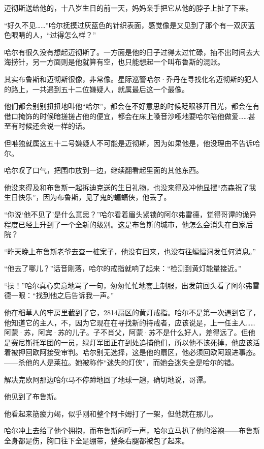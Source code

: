 \documentclass[../main]{subfiles}
\begin{document}
迈彻斯送给他的，十八岁生日的前一天，妈妈亲手把它从他的脖子上扯了下来。

“好久不见\ldots\ldots”哈尔抚摸过灰蓝色的针织表面，感觉像是又见到了那个有一双灰蓝色眼睛的人，“过得怎么样？”

哈尔有很久没有想起迈彻斯了。一方面是他的日子过得太过忙碌，抽不出时间去大海捞针，另一方面则是他就算有空，也只能想起一个叫布鲁斯的混账。

其实布鲁斯和迈彻斯很像，非常像。星际巡警哈尔·乔丹在寻找化名迈彻斯的犯人的路上，一共遇到五十二位嫌疑人，就属最后这一个最像。

他们都会别别扭扭地叫他“哈尔”，都会在不好意思的时候眨眼移开目光，都会在有借口掩饰的时候暗搓搓占他的便宜，都会在床上嗓音沙哑地要哈尔陪他做爱……甚至有时候还会说一样的话。

但唯独就属这五十二号嫌疑人不可能是迈彻斯，因为如果他是，他没理由不告诉哈尔。

哈尔叹了口气，把围巾放到一边，继续翻看起里面的其他东西。

他没来得及和布鲁斯一起拆迪克送的生日礼物，也没来得及冲他显摆“杰森祝了我生日快乐”，因为布鲁斯，见了鬼的蝙蝠侠，他丢了。

“你说`他不见了'是什么意思？”哈尔看着眉头紧锁的阿尔弗雷德，觉得哥谭的诡异程度已经上升到了一个全新的级别。这是布鲁斯的城市，他怎么会消失在自家后院？

“昨天晚上布鲁斯老爷去查一桩案子，他没有回来，也没有往蝙蝠洞发任何消息。”

“他去了哪儿？”话音刚落，哈尔的戒指就响了起来：“检测到黄灯能量接近。”

“操！”哈尔真心实意地骂了一句，匆匆忙忙地套上制服，出发前回头看了阿尔弗雷德一眼：“找到他之后告诉我一声。”

他在稻草人的牢房里截到了它，2814扇区的黄灯戒指。哈尔不是第一次遇到它了，他知道它的主人，不，因为它现在在寻找新的持戒者，应该说是，上一任主人……阿蒙·苏，阿宾·苏的儿子。子不肖父，阿蒙·苏不是什么好人，差得远了。但他是赛尼斯托军团的一员，绿灯军团正在到处追捕他们，所以他不该死掉，他应该活着被押回欧阿接受审判。哈尔别无选择，这是他的扇区，他必须回欧阿跟进事态。——杀他的人是莱拉。她被称作“迷失的灯侠”，而她会迷失全是哈尔的错。

解决完欧阿那边哈尔马不停蹄地回了地球一趟，确切地说，哥谭。

他见到了布鲁斯。

他看起来筋疲力竭，似乎刚和整个阿卡姆打了一架，但他就在那儿。

哈尔冲上去给了他个拥抱，而布鲁斯闷哼一声，哈尔立马扒了他的浴袍——布鲁斯全身都是伤，胸口往下全是绷带，整条右腿都被包了起来。
\end{document}
